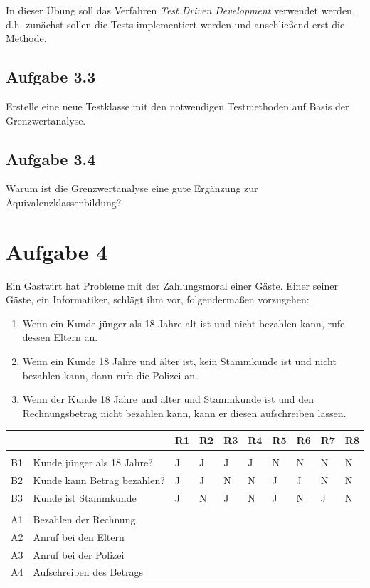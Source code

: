 In dieser Übung soll das Verfahren \textit{Test Driven Development} verwendet werden, d.h. zunächst sollen die Tests implementiert werden und anschließend erst die Methode.

\subsection*{Aufgabe 3.3}
Erstelle eine neue Testklasse mit den notwendigen Testmethoden auf Basis der Grenzwertanalyse.

\subsection*{Aufgabe 3.4}
Warum ist die Grenzwertanalyse eine gute Ergänzung zur Äquivalenzklassenbildung?

\newpage
\section*{Aufgabe 4}
Ein Gastwirt hat Probleme mit der Zahlungsmoral einer Gäste. Einer seiner Gäste, ein Informatiker, schlägt ihm vor, folgendermaßen vorzugehen:

\begin{enumerate}
\item Wenn ein Kunde jünger als 18 Jahre alt ist und nicht bezahlen kann, rufe dessen Eltern an.
\item Wenn ein Kunde 18 Jahre und älter ist, kein Stammkunde ist und nicht bezahlen kann, dann rufe die Polizei an.
\item Wenn der Kunde 18 Jahre und älter und Stammkunde ist und den Rechnungsbetrag nicht bezahlen kann, kann er diesen aufschreiben lassen.
\end{enumerate}

\begin{center}
\begin{tabular}{|l|l|l|l|l|l|l|l|l|l|}
\hline
\rowcolor{ivory}
 & & R1 & R2 & R3 & R4 & R5 & R6 & R7 & R8\\\hline
 \rowcolor{ivory}
\multicolumn{10}{|l|}{\textbf{Bedingungen}} \\ \hline
B1 & Kunde jünger als 18 Jahre?  & J & J & J & J & N & N & N & N \\ \hline
B2 & Kunde kann Betrag bezahlen? & J & J & N & N & J & J & N & N \\ \hline 
B3 & Kunde ist Stammkunde        & J & N & J & N & J & N & J & N \\ \hline
\rowcolor{ivory}
\multicolumn{10}{|l|}{\textbf{Aktionen}} \\ \hline
A1 & Bezahlen der Rechnung       &   &   &   &   &   &   &   &   \\ \hline 
A2 & Anruf bei den Eltern        &   &   &   &   &   &   &   &   \\ \hline
A3 & Anruf bei der Polizei       &   &   &   &   &   &   &   &   \\ \hline
A4 & Aufschreiben des Betrags    &   &   &   &   &   &   &   &   \\ \hline
\end{tabular}
\end{center}

